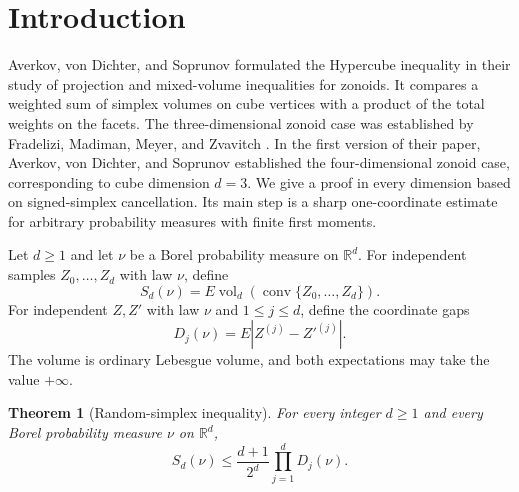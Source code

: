 \documentclass[11pt]{article}
\newtheorem{theorem}{Theorem}[section]
\theoremstyle{remark}
\newcommand{\R}{\mathbb{R}}
\newcommand{\E}{E}
\newcommand{\vol}{\operatorname{vol}}
\newcommand{\conv}{\operatorname{conv}}
\begin{document}
\section{Introduction}
\label{sec:intro}
\begin{humanblock}
Averkov, von Dichter, and Soprunov \cite{AVS} formulated the Hypercube inequality in their study of projection and mixed-volume inequalities for zonoids. It compares a weighted sum of simplex volumes on cube vertices with a product of the total weights on the facets. The three-dimensional zonoid case was established by Fradelizi, Madiman, Meyer, and Zvavitch \cite{FMMZ}. In the first version of their paper, Averkov, von Dichter, and Soprunov established the four-dimensional zonoid case, corresponding to cube dimension $d=3$. We give a proof in every dimension based on signed-simplex cancellation. Its main step is a sharp one-coordinate estimate for arbitrary probability measures with finite first moments.
















Let $d\geq1$ and let $\nu$ be a Borel probability measure on $\R^d$. For independent samples $Z_0,\ldots,Z_d$ with law $\nu$, define
\begin{equation}
S_d(\nu)=\E\vol_d(\conv\{Z_0,\ldots,Z_d\}).
\end{equation}
For independent $Z,Z'$ with law $\nu$ and $1\leq j\leq d$, define the coordinate gaps
\begin{equation}
D_j(\nu)=\E|Z^{(j)}-Z'^{(j)}|.
\end{equation}
The volume is ordinary Lebesgue volume, and both expectations may take the value $+\infty$.

\begin{theorem}[Random-simplex inequality]
\label{thm:main}
For every integer $d\geq1$ and every Borel probability measure $\nu$ on $\R^d$,
\begin{equation}
S_d(\nu)\leq\frac{d+1}{2^d}\prod_{j=1}^dD_j(\nu).
\end{equation}





\end{theorem}
\end{humanblock}
\end{document}
